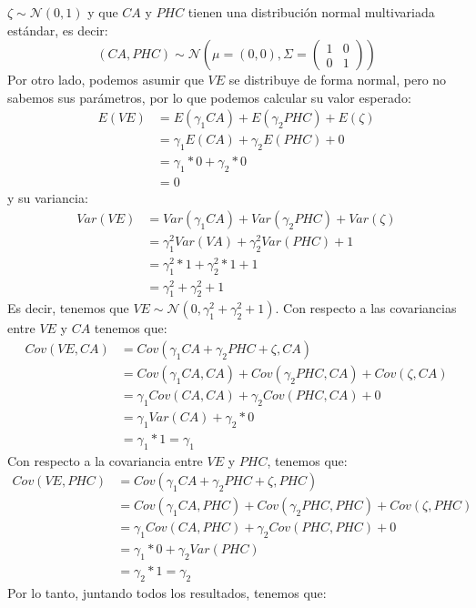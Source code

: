 \documentclass[
  english]{revcoles}
\begin{document}
\(\zeta \sim \mathcal{N} (0,1)\) y que \(CA\) y \(PHC\) tienen una
distribución normal multivariada estándar, es decir: \[
    (CA, PHC) \sim \mathcal{N} \left(\mu = (0,0), \Sigma = \begin{pmatrix}
        1 & 0 \\
        0 & 1
    \end{pmatrix} \right)
\] Por otro lado, podemos asumir que \(VE\) se distribuye de forma
normal, pero no sabemos sus parámetros, por lo que podemos calcular su
valor esperado: \begin{align*}
    E(VE) & = E(\gamma_1 CA) + E(\gamma_2 PHC) + E(\zeta) \\
          & = \gamma_1 E(CA) + \gamma_2 E(PHC) + 0        \\
          & = \gamma_1 * 0 + \gamma_2 * 0                 \\
          & = 0
\end{align*} y su variancia: \begin{align*}
    Var(VE) & = Var(\gamma_1 CA) + Var(\gamma_2 PHC) + Var(\zeta) \\
            & = \gamma_1^2 Var(VA) + \gamma_2^2 Var(PHC) + 1      \\
            & = \gamma_1^2 * 1 + \gamma_2^2 * 1 + 1               \\
            & = \gamma_1^2 + \gamma_2^2 + 1
\end{align*} Es decir, tenemos que
\(VE \sim \mathcal{N} (0, \gamma_1^2 + \gamma_2^2 + 1)\). Con respecto a
las covariancias entre \(VE\) y \(CA\) tenemos que: \begin{align*}
    Cov(VE, CA) & = Cov(\gamma_1 CA + \gamma_2 PHC + \zeta, CA)                   \\
                & = Cov(\gamma_1 CA, CA) + Cov(\gamma_2 PHC, CA) + Cov(\zeta, CA) \\
                & = \gamma_1 Cov(CA, CA) + \gamma_2 Cov(PHC, CA) + 0              \\
                & = \gamma_1 Var(CA) + \gamma_2 * 0                               \\
                & = \gamma_1 * 1 = \gamma_1
\end{align*} Con respecto a la covariancia entre \(VE\) y \(PHC\),
tenemos que: \begin{align*}
    Cov(VE, PHC) & = Cov(\gamma_1 CA + \gamma_2 PHC + \zeta, PHC)                     \\
                 & = Cov(\gamma_1 CA, PHC) + Cov(\gamma_2 PHC, PHC) + Cov(\zeta, PHC) \\
                 & = \gamma_1 Cov(CA, PHC) + \gamma_2 Cov(PHC, PHC) + 0               \\
                 & = \gamma_1 * 0 + \gamma_2 Var(PHC)                                 \\
                 & = \gamma_2 * 1 = \gamma_2
\end{align*} Por lo tanto, juntando todos los resultados, tenemos que:
\end{document}
